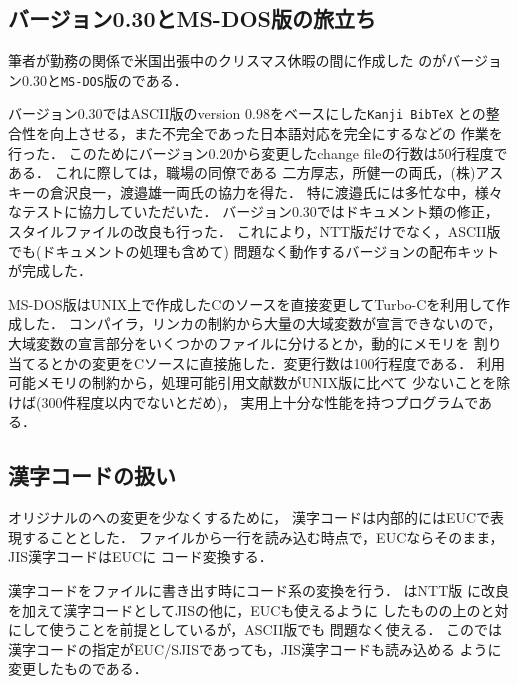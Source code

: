 \subsection{バージョン0.30とMS-DOS版の旅立ち}
筆者が勤務の関係で米国出張中のクリスマス休暇の間に作成した
のがバージョン0.30と{\tt MS-DOS}版の\JBibTeX である．

バージョン0.30ではASCII版のversion 0.98をベースにした{\tt Kanji BibTeX}
との整合性を向上させる，また不完全であった日本語対応を完全にするなどの
作業を行った．
このためにバージョン0.20から変更したchange fileの行数は50行程度である．
これに際しては，職場の同僚である
二方厚志，所健一の両氏，(株)アスキーの倉沢良一，渡邉雄一両氏の協力を得た．
特に渡邉氏には多忙な中，様々なテストに協力していただいた．
バージョン0.30ではドキュメント類の修正，スタイルファイルの改良も行った．
これにより，NTT版だけでなく，ASCII版でも(ドキュメントの処理も含めて)
問題なく動作するバージョンの配布キットが完成した．

MS-DOS版はUNIX上で作成したCのソースを直接変更してTurbo-Cを利用して作成した．
コンパイラ，リンカの制約から大量の大域変数が宣言できないので，
大域変数の宣言部分をいくつかのファイルに分けるとか，動的にメモリを
割り当てるとかの変更をCソースに直接施した．変更行数は100行程度である．
利用可能メモリの制約から，処理可能引用文献数がUNIX版に比べて
少ないことを除けば(300件程度以内でないとだめ)，
実用上十分な性能を持つプログラムである．

\subsection{漢字コードの扱い}

オリジナルの\BibTeX への変更を少なくするために，
漢字コードは内部的にはEUCで表現することとした．
ファイルから一行を読み込む時点で，EUCならそのまま，JIS漢字コードはEUCに
コード変換する．

漢字コードをファイルに書き出す時にコード系の変換を行う．\JBibTeX
はNTT版 \JTeX に改良を加えて漢字コードとしてJISの他に，EUCも使えるように
したものの上の\JLaTeX と対にして使うことを前提としているが，ASCII版でも
問題なく使える．
この\JTeX では漢字コードの指定がEUC/SJISであっても，JIS漢字コードも読み込める
ように変更したものである．

